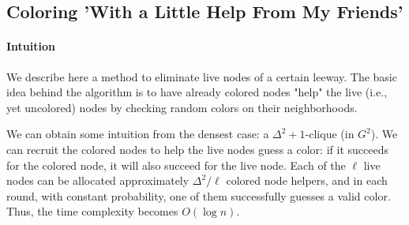 \iffalse %
\subsubsection{An attempt to reorganize the structural properties}
\begin{lemma}[Structural Properties]
Assume that xyz holds for the similarity graphs $H$ and $\hat{H}$. ...and assume that all live nodes have leeway $\psi$ ?!?
Then we have
\begin{enumerate}
\item A node of sparsity $\zeta$ has at least $\Delta^2 - 8\zeta/k -4/k$ neighbors in $H_{1-k}$. \ym{Here we do not need that $v$ is live, do we?}
\item Let $v$ be $\zeta$-sparse.
The number of nodes that are within distance 2 of $v$ in $H$ but are not d2-neighbors of $v$ is
$|N_{H^2}(v) \setminus N_{G^2(v)}| \le 6\zeta$.
\item An $\hat{H}$-neighbor of a solid node has at least $\Delta^2/3$ $H$-neighbors.
\item A solid node $v$ has at least $\Delta^2/2$ $\hat{H}[v]$-neighbors with a single 2-path to $v$.
\end{enumerate}
\end{lemma}
\begin{proof}
insert the four proofs. 
\end{proof}
\fi

\subsection{Coloring 'With a Little Help From My Friends'}

\paragraph{Intuition}
We describe here a method to eliminate live nodes of a certain leeway.
The basic idea behind the algorithm is to have already colored nodes "help" the live (i.e., yet uncolored) nodes by checking random colors on their neighborhoods.

We can obtain some intuition from the densest case: a $\Delta^2+1$-clique (in $G^2$).
We can recruit the colored nodes to help the live nodes guess a color: if it succeeds for the colored node, it will also succeed for the live node. Each of the $\ell$ live nodes can be allocated approximately $\Delta^2/\ell$ colored node helpers, and in each round, with constant probability, one of them successfully guesses a valid color. Thus, the time complexity becomes $O(\log n)$.

